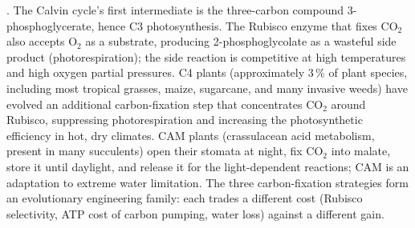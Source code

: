 . The Calvin cycle's first intermediate is the
three-carbon compound 3-phosphoglycerate, hence C3 photosynthesis.
The Rubisco enzyme that fixes CO$_2$ also accepts O$_2$ as a
substrate, producing 2-phosphoglycolate as a wasteful side product
(photorespiration); the side reaction is competitive at high
temperatures and high oxygen partial pressures. C4 plants
(approximately $3\,\%$ of plant species, including most tropical
grasses, maize, sugarcane, and many invasive weeds) have evolved an
additional carbon-fixation step that concentrates CO$_2$ around
Rubisco, suppressing photorespiration and increasing the
photosynthetic efficiency in hot, dry climates. CAM plants
(crassulacean acid metabolism, present in many succulents) open their
stomata at night, fix CO$_2$ into malate, store it until daylight,
and release it for the light-dependent reactions; CAM is an
adaptation to extreme water limitation. The three carbon-fixation
strategies form an evolutionary engineering family: each trades a
different cost (Rubisco selectivity, ATP cost of carbon pumping,
water loss) against a different gain.

